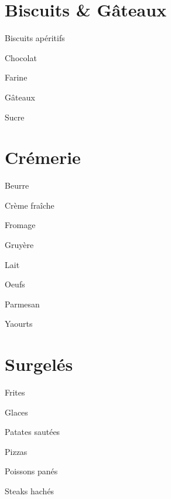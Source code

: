 \documentclass[8pt,landscape,a4paper]{article}
\begin{document}
\begin{multicols*}{4}
    \section{Biscuits \& Gâteaux}
    \begin{todolist}
    \item Biscuits apéritifs
    \item Chocolat
    \item Farine
    \item Gâteaux
    \item Sucre
    \item 
    \item 
    \item 
    \item 
    \end{todolist}

    \section{Crémerie}
    \begin{todolist}
    \item Beurre
    \item Crème fraîche
    \item Fromage
    \item Gruyère
    \item Lait
    \item Oeufs
    \item Parmesan 
    \item Yaourts
    \item 
    \item 
    \item 
    \item
    \end{todolist}

    \section{Surgelés}
    \begin{todolist}
    \item Frites
    \item Glaces
    \item Patates sautées
    \item Pizzas
    \item Poissons panés
    \item Steaks hachés
    \item 
    \item 
    \item 
    \item
    \item
    \end{todolist}



\end{multicols*}
\end{document}
